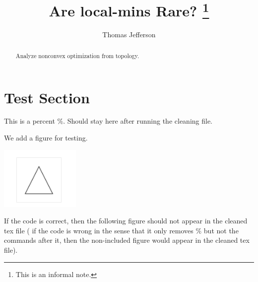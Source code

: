 \documentclass{article}%
\title{ \bf Are local-mins Rare?
 \footnote{This is an informal note. }
} \vskip 1cm
\author{ Thomas Jefferson
}
\date{}
\begin{document}
%
\maketitle
%

\begin{abstract}

Analyze nonconvex optimization from topology. 

\end{abstract}

\thispagestyle{empty}




\section{Test Section}

This is a percent \%.  Should stay here after running the cleaning file. 

We add a figure for testing. 

\includegraphics{images/im1_included.png}

If the code is correct, then the following figure should not appear in the cleaned tex file (
if the code is wrong in the sense that it only removes $\%$ but not the commands
after it, then the non-included figure would appear in the cleaned tex  file).

\end{document}
